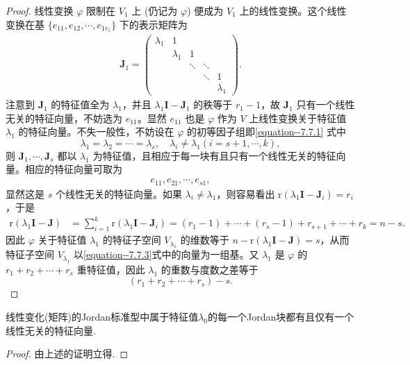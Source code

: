 \documentclass[../../main.tex]{subfiles}
\begin{document}
\begin{proof}
线性变换 $\varphi$ 限制在 $V_1$ 上 (仍记为 $\varphi$) 便成为 $V_1$ 上的线性变换。这个线性变换在基 $\{e_{11}, e_{12}, \cdots, e_{1r_1}\}$ 下的表示矩阵为
\begin{align*}
\boldsymbol{J}_1 = 
\begin{pmatrix}
\lambda_1 & 1 & & & \\
 & \lambda_1 & 1 & & \\
 & & \ddots & \ddots & \\
 & & & \ddots & 1 \\
 & & & & \lambda_1
\end{pmatrix}.
\end{align*}
注意到 $\boldsymbol{J}_1$ 的特征值全为 $\lambda_1$，并且 $\lambda_1\boldsymbol{I} - \boldsymbol{J}_1$ 的秩等于 $r_1 - 1$，故 $\boldsymbol{J}_1$ 只有一个线性无关的特征向量，不妨选为 $e_{11}$。显然 $e_{11}$ 也是 $\varphi$ 作为 $V$ 上线性变换关于特征值 $\lambda_1$ 的特征向量。不失一般性，不妨设在 $\varphi$ 的初等因子组即\eqref{equation--7.7.1} 式中
\[
\lambda_1 = \lambda_2 = \cdots = \lambda_s, \quad \lambda_i \neq \lambda_1 (i = s + 1, \cdots, k),
\]
则 $\boldsymbol{J}_1, \cdots, \boldsymbol{J}_s$ 都以 $\lambda_1$ 为特征值，且{\heiti 相应于每一块有且只有一个线性无关的特征向量}。相应的特征向量可取为
\begin{align}
e_{11}, e_{21}, \cdots, e_{s1}, \label{equation--7.7.3}
\end{align}
显然这是 $s$ 个线性无关的特征向量。如果 $\lambda_i \neq \lambda_1$，则容易看出 $\mathrm{r}(\lambda_1\boldsymbol{I} - \boldsymbol{J}_i) = r_i$，于是
\begin{align*}
\mathrm{r}(\lambda_1\boldsymbol{I} - \boldsymbol{J}) &= \sum_{i = 1}^{k} \mathrm{r}(\lambda_1\boldsymbol{I} - \boldsymbol{J}_i) = (r_1 - 1) + \cdots + (r_s - 1) + r_{s + 1} + \cdots + r_k = n - s.
\end{align*}
因此 $\varphi$ 关于特征值 $\lambda_1$ 的特征子空间 $V_{\lambda_1}$ 的维数等于 $n - \mathrm{r}(\lambda_1\boldsymbol{I} - \boldsymbol{J}) = s$，从而特征子空间 $V_{\lambda_1}$ 以\eqref{equation--7.7.3}式中的向量为一组基。又 $\lambda_1$ 是 $\varphi$ 的 $r_1 + r_2 + \cdots + r_s$ 重特征值，因此 $\lambda_1$ 的重数与度数之差等于
\[
(r_1 + r_2 + \cdots + r_s) - s.
\]
\end{proof}

\begin{corollary}\label{corollary:每个Jordan块都有且仅有一个线性无关的特征向量}
线性变化(矩阵)的Jordan标准型中属于特征值$\lambda_0$的每一个Jordan块都有且仅有一个线性无关的特征向量.
\end{corollary}
\begin{proof}
由上述的证明立得.
\end{proof}
\end{document}
